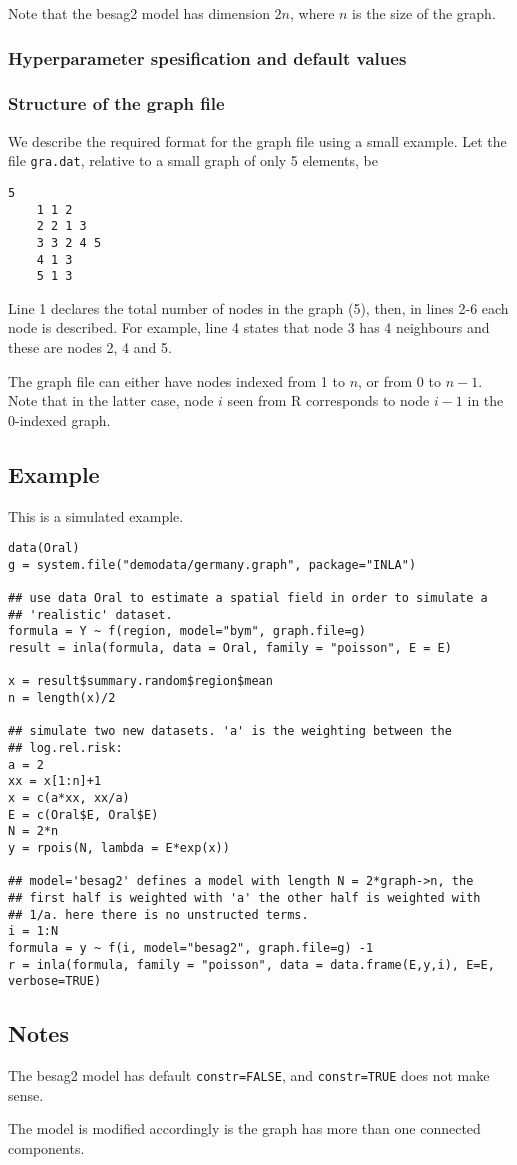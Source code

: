 \documentclass[a4paper,11pt]{article}
\begin{document}
Note that the besag2 model has dimension $2 n$, where $n$ is the size
of the graph.

\subsubsection*{Hyperparameter spesification and default values}




\subsubsection*{Structure of the graph file}

We describe the required format for the graph file using a small
example. Let the file {\tt gra.dat}, relative to a small graph of only
5 elements, be
\begin{lstlisting}[basicstyle=\footnotesize]
    5
    1 1 2
    2 2 1 3
    3 3 2 4 5 
    4 1 3
    5 1 3
\end{lstlisting}
Line 1 declares the total number of nodes in the graph (5), then, in
lines 2-6 each node is described. For example, line 4 states that node
3 has 4 neighbours and these are nodes 2, 4 and 5.

The graph file can either have nodes indexed from 1 to $n$, or from 0
to $n-1$. Note that in the latter case, node $i$ seen from R
corresponds to node $i-1$ in the 0-indexed graph.



\subsection*{Example}

This is a simulated example.

\begin{verbatim}
data(Oral)
g = system.file("demodata/germany.graph", package="INLA")

## use data Oral to estimate a spatial field in order to simulate a
## 'realistic' dataset.
formula = Y ~ f(region, model="bym", graph.file=g)
result = inla(formula, data = Oral, family = "poisson", E = E)

x = result$summary.random$region$mean
n = length(x)/2

## simulate two new datasets. 'a' is the weighting between the
## log.rel.risk:
a = 2
xx = x[1:n]+1
x = c(a*xx, xx/a)
E = c(Oral$E, Oral$E)
N = 2*n
y = rpois(N, lambda = E*exp(x))

## model='besag2' defines a model with length N = 2*graph->n, the
## first half is weighted with 'a' the other half is weighted with
## 1/a. here there is no unstructed terms.
i = 1:N
formula = y ~ f(i, model="besag2", graph.file=g) -1
r = inla(formula, family = "poisson", data = data.frame(E,y,i), E=E, verbose=TRUE)
\end{verbatim}


\subsection*{Notes}

The besag2 model has default \texttt{constr=FALSE}, and
\texttt{constr=TRUE} does not make sense.

The model is modified accordingly is the graph has more than one
connected components.
\end{document}
